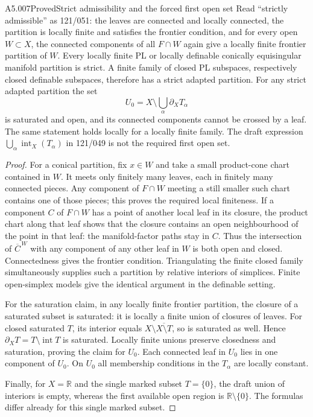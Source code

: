 \begin{saresult}{A5.007}{Proved}{Strict admissibility and the forced first open set}
Read ``strictly admissible'' as 121/051: the leaves are connected
and locally connected, the partition is locally finite and satisfies
the frontier condition, and for every open $W\subset X$, the
connected components of all $F\cap W$ again give a locally finite
frontier partition of $W$.  Every locally finite PL or locally definable conically
equisingular manifold partition is strict.  A finite family of
closed PL subspaces, respectively closed definable subspaces,
therefore has a strict adapted partition.  For any strict adapted
partition the set
\[
 U_0=X\setminus\bigcup_\alpha\partial_XT_\alpha
\]
is saturated and open, and its connected components cannot be
crossed by a leaf.  The same statement holds locally for a locally
finite family.  The draft expression
$\bigcup_\alpha\operatorname{int}_X(T_\alpha)$ in 121/049 is not
the required first open set.
\end{saresult}
\begin{proof}
For a conical partition, fix $x\in W$ and take a small product-cone
chart contained in $W$.  It meets only finitely many leaves, each
in finitely many connected pieces.  Any component of $F\cap W$
meeting a still smaller such chart contains one of those pieces;
this proves the required local finiteness.  If a component $C$ of
$F\cap W$ has a point of another local leaf in its closure, the
product chart along that leaf shows that the closure contains an
open neighbourhood of the point in that leaf: the manifold-factor
paths stay in $C$.  Thus the intersection of $\overline C^{\,W}$
with any component of any other leaf in $W$ is both open and
closed.  Connectedness gives the frontier condition.  Triangulating
the finite closed family simultaneously supplies such a partition
by relative interiors of simplices.  Finite open-simplex models
give the identical argument in the definable setting.

For the saturation claim, in any locally finite frontier partition,
the closure of a saturated subset is saturated: it is locally a
finite union of closures of leaves.  For closed saturated $T$, its
interior equals $X\setminus\overline{X\setminus T}$, so is
saturated as well.  Hence $\partial_XT=T\setminus\operatorname{int}T$
is saturated.  Locally finite unions preserve closedness and
saturation, proving the claim for $U_0$.  Each connected leaf in
$U_0$ lies in one component of $U_0$.  On $U_0$ all membership
conditions in the $T_\alpha$ are locally constant.

Finally, for $X=\mathbb R$ and the single marked subset
$T=\{0\}$, the draft union of interiors is empty, whereas the
first available open region is $\mathbb R\setminus\{0\}$.
The formulas differ already for this single marked subset.
\end{proof}

